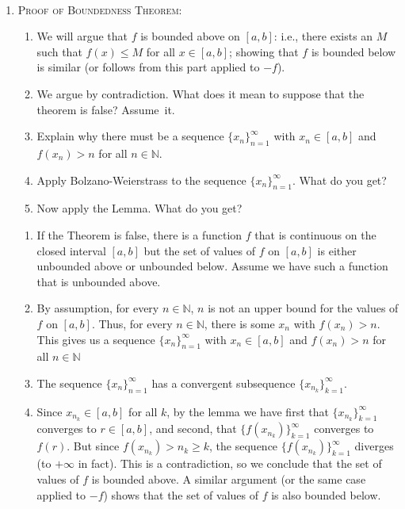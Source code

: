 \documentclass[12pt]{amsart}
\newcommand{\N}{\mathbb{N}}
\numberwithin{equation}{section}
\theoremstyle{plain} %
\theoremstyle{definition}
\theoremstyle{remark}
\begin{document}
\

\begin{enumerate}
\item \textsc{Proof of Boundedness Theorem:}
\begin{enumerate}
\item[\null] We will argue that $f$ is bounded above on $[a,b]$: i.e., there exists an $M$ such that $f(x)\leq M$ for all $x\in[a,b]$; showing that $f$ is bounded below is similar (or follows from this part applied to $-f$).
\item We argue by contradiction. What does it mean to suppose that the theorem is false? Assume~it.
\item Explain why there must be a sequence $\{x_n\}_{n=1}^\infty$ with $x_n\in[a,b]$ and $f(x_n)>n$ for all $n\in \N$.
\item Apply Bolzano-Weierstrass to the sequence $\{x_n\}_{n=1}^\infty$. What do you get?
\item Now apply the Lemma. What do you get?
\end{enumerate}

\begin{framed}
\begin{enumerate}
\item If the Theorem is false, there is a function $f$ that is continuous on the closed interval $[a,b]$ but the set of values of $f$ on $[a,b]$ is either unbounded above or unbounded below. Assume we have such a function that is unbounded above.
\item By assumption, for every $n\in \N$, $n$ is not an upper bound for the values of $f$ on $[a,b]$. Thus, for every $n\in \N$, there is some $x_n$ with $f(x_n)>n$. This gives us a sequence $\{x_n\}_{n=1}^\infty$ with $x_n\in[a,b]$ and $f(x_n)>n$ for all $n\in \N$
\item The sequence $\{x_n\}_{n=1}^\infty$ has a convergent subsequence $\{x_{n_k}\}_{k=1}^\infty$.
\item Since $x_{n_k}\in[a,b]$ for all $k$, by the lemma we have first that $\{x_{n_k}\}_{k=1}^\infty$ converges to $r\in [a,b]$, and second, that $\{f(x_{n_k})\}_{k=1}^\infty$ converges to $f(r)$. But since $f(x_{n_k})> n_k \geq k$, the sequence $\{f(x_{n_k})\}_{k=1}^\infty$ diverges (to $+\infty$ in fact). This is a contradiction, so we conclude that the set of values of $f$ is bounded above. A similar argument (or the same case applied to $-f$) shows that the set of values of $f$ is also bounded below.
\end{enumerate}
\end{framed}



\end{enumerate}
\end{document}
